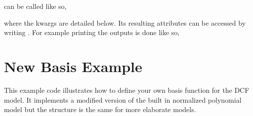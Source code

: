 \documentclass[letterpaper,10pt,english]{sphinxmanual}
\begin{document}
 can be called like so,

\begin{sphinxVerbatim}[commandchars=\\\{\}]
     
\end{sphinxVerbatim}

where the kwargs are detailed below. It\textquotesingle{}s resulting attributes can be accessed by writing
. For example printing the outputs is done like
so,

\begin{sphinxVerbatim}[commandchars=\\\{\}]
 
 
 
 
 
 
\end{sphinxVerbatim}


\section{New Basis Example}
\label{\detokenize{source/maxsmooth:new-basis-example}}
This example code illustrates how to define your own basis function for the
DCF model.
It implements a modified version of the built in normalized polynomial model
but the structure is the same for more elaborate models.
\end{document}
